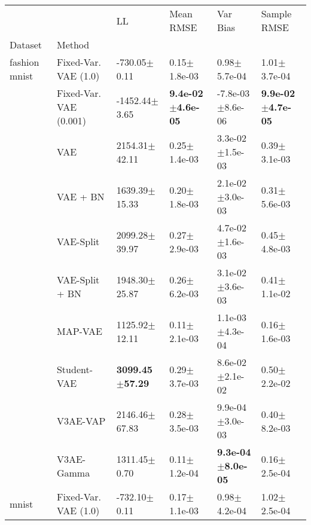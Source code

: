 \begin{tabular}{llllll}
\toprule
             &     &                           LL &                     Mean RMSE &                       Var Bias &                   Sample RMSE \\
Dataset & Method &                              &                               &                                &                               \\
\midrule
fashion mnist & Fixed-Var. VAE (1.0) &             -730.05$\pm$0.11 &              0.15$\pm$1.8e-03 &               0.98$\pm$5.7e-04 &              1.01$\pm$3.7e-04 \\
             & Fixed-Var. VAE (0.001) &            -1452.44$\pm$3.65 &  \textbf{9.4e-02$\pm$4.6e-05} &           -7.8e-03$\pm$8.6e-06 &  \textbf{9.9e-02$\pm$4.7e-05} \\
             & VAE &            2154.31$\pm$42.11 &              0.25$\pm$1.4e-03 &            3.3e-02$\pm$1.5e-03 &              0.39$\pm$3.1e-03 \\
             & VAE + BN &            1639.39$\pm$15.33 &              0.20$\pm$1.8e-03 &            2.1e-02$\pm$3.0e-03 &              0.31$\pm$5.6e-03 \\
             & VAE-Split &            2099.28$\pm$39.97 &              0.27$\pm$2.9e-03 &            4.7e-02$\pm$1.6e-03 &              0.45$\pm$4.8e-03 \\
             & VAE-Split + BN &            1948.30$\pm$25.87 &              0.26$\pm$6.2e-03 &            3.1e-02$\pm$3.6e-03 &              0.41$\pm$1.1e-02 \\
             & MAP-VAE &            1125.92$\pm$12.11 &              0.11$\pm$2.1e-03 &            1.1e-03$\pm$4.3e-04 &              0.16$\pm$1.6e-03 \\
             & Student-VAE &   \textbf{3099.45$\pm$57.29} &              0.29$\pm$3.7e-03 &            8.6e-02$\pm$2.1e-02 &              0.50$\pm$2.2e-02 \\
             & V3AE-VAP &            2146.46$\pm$67.83 &              0.28$\pm$3.5e-03 &            9.9e-04$\pm$3.0e-03 &              0.40$\pm$8.2e-03 \\
             & V3AE-Gamma &             1311.45$\pm$0.70 &              0.11$\pm$1.2e-04 &   \textbf{9.3e-04$\pm$8.0e-05} &              0.16$\pm$2.5e-04 \\
mnist & Fixed-Var. VAE (1.0) &             -732.10$\pm$0.11 &              0.17$\pm$1.1e-03 &               0.98$\pm$4.2e-04 &              1.02$\pm$2.5e-04 \\

\end{tabular}
